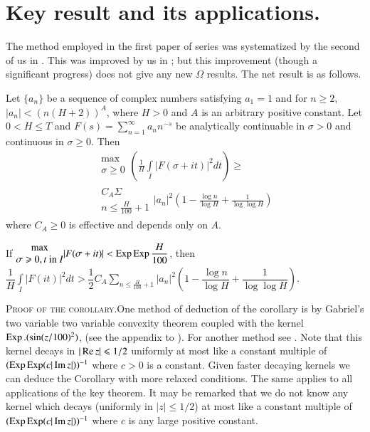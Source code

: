 \section{Key result and its applications.}\label{art2-sec2}
The method employed in the first paper of series was systematized by the second of us in \cite{art2-key14}. This was improved by us in \cite{art2-key5}; but this improvement (though a significant progress) does not give any new $\Omega$ results. The net result is as follows.

\begin{theorem}\label{art2-thm1}
Let $\{a_n\}$ be a sequence of complex numbers satisfying $a_1 = 1$ and for $n \geqslant 2$, $|a_n| < (n(H+2))^A$, where $H>0$ and $A$ is an arbitrary positive constant. Let $0 < H \leqslant T$ and $F(s) = \sum\limits^\infty_{n=1} a_n n^{-s}$  be analytically continuable in $\sigma > 0$ and continuous in $\sigma \geqslant 0$.  Then 
\begin{gather*}
\begin{matrix}
\max \\
\sigma \geqslant 0 
\end{matrix}
\left(\frac{1}{H} \int\limits_I |F(\sigma + it)|^2 dt \right) \geqslant \\
\begin{matrix}
C_A \Sigma\\
n \leqslant \frac{H}{100} + 1 
\end{matrix} |a_n|^2
\left(1 - \frac{\log n}{\log H} + \frac{1}{\log \log H} \right)
\end{gather*}
where $C_A \geqslant 0$ is effective and depends only on $A$.
\end{theorem}

\begin{coro*}
If $\begin{matrix}
\max\\
\sigma \geqslant 0, t \text{ in } I
\end{matrix} |F(\sigma + it)| < \operatorname{Exp} \operatorname{Exp} \dfrac{H}{100}$, then $\dfrac{1}{H} \int\limits_I |F(it)|^2 dt > \dfrac{1}{2} C_A \sum\limits_{n \leqslant \frac{H}{100} +1} |a_n|^2 \left(1-\dfrac{\log n }{\log H} + \dfrac{1}{\log \log H} \right)$. 
\end{coro*}

\noindent
\textsc{Proof of the corollary.}\pageoriginale One method of deduction of the corollary is by Gabriel's two variable two variable convexity theorem coupled with the kernel $\operatorname{Exp}. (\sin (z/100)^2)$, (see the appendix to \cite{art2-key15}). For another method see \cite{art2-key14}. Note that this kernel decays in $|\operatorname{Re} z | \leqslant 1/2$ uniformly at most like a constant multiple of $(\operatorname{Exp} \operatorname{Exp} (c |\operatorname{Im} z|))^{-1}$ where $c >0$ is a constant. Given faster decaying kernels we can deduce the Corollary with more relaxed conditions. The same applies to all applications of the key theorem. It may be remarked that we do not know any kernel which decays (uniformly in $|z | \leqslant 1/2$) at most like a constant multiple of $(\operatorname{Exp}\operatorname{Exp} (c|\operatorname{Im} z|))^{-1}$ where $c$ is any large positive constant. 

